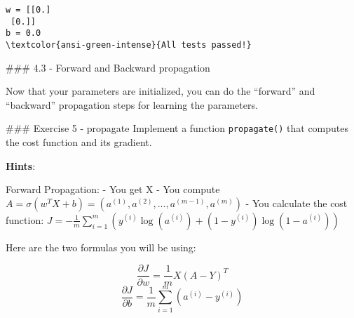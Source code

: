 \documentclass[11pt]{article}
\begin{document}
    \begin{Verbatim}[commandchars=\\\{\}]
w = [[0.]
 [0.]]
b = 0.0
\textcolor{ansi-green-intense}{All tests passed!}
    \end{Verbatim}

    \#\#\# 4.3 - Forward and Backward propagation

Now that your parameters are initialized, you can do the ``forward'' and
``backward'' propagation steps for learning the parameters.

\#\#\# Exercise 5 - propagate Implement a function \texttt{propagate()}
that computes the cost function and its gradient.

\textbf{Hints}:

Forward Propagation: - You get X - You compute
\(A = \sigma(w^T X + b) = (a^{(1)}, a^{(2)}, ..., a^{(m-1)}, a^{(m)})\)
- You calculate the cost function:
\(J = -\frac{1}{m}\sum_{i=1}^{m}(y^{(i)}\log(a^{(i)})+(1-y^{(i)})\log(1-a^{(i)}))\)

Here are the two formulas you will be using:

\[ \frac{\partial J}{\partial w} = \frac{1}{m}X(A-Y)^T\tag{7}\]
\[ \frac{\partial J}{\partial b} = \frac{1}{m} \sum_{i=1}^m (a^{(i)}-y^{(i)})\tag{8}\]
\end{document}
